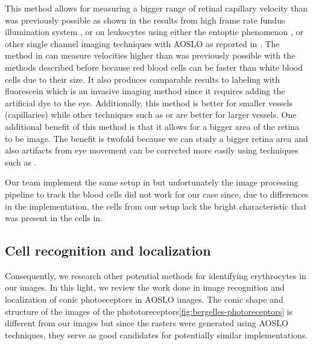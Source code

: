 \documentclass[]{article}
\begin{document}
This method allows for measuring a bigger range of retinal capillary velocity than was previously possible as shown in the results from high frame rate fundus illumination system \cite{bedggood_direct_2012}, or on leukocytes using either the entoptic phenomenon \cite{riva_blue_1980}\cite{grunwald_effect_1993}, or other single channel imaging techniques with AOSLO \cite{martin_pulsatility_2009}\cite{martin_direct_2005}\cite{tam_speed_2011}\cite{tam_characterization_2011} as reported in \cite{castro_rapid_2016}.
The method in\cite{castro_rapid_2016} can measure velocities higher than was previously possible with the methods described before because red blood cells can be faster than white blood cells due to their size. 
It also produces comparable results to labeling with fluorescein\cite{yang_fluorescent_1997}\cite{paques_evaluation_2000} which is an invasive imaging method since it requires adding the artificial dye to the eye.
Additionally, this method is better for smaller vessels (capillaries)  while other techniques such as \cite{zhong_vivo_2008} or \cite{riva_laser_1972} are better for larger vessels.
One additional benefit of this method is that it allows for a bigger area of the retina to be image.
The benefit is twofold because we can  study a bigger retina area and also artifacts from eye movement can be corrected more easily using techniques such as \cite{dubra_registration_2010}.

Our team implement the same setup in \cite{castro_rapid_2016} but unfortunately the image processing pipeline to track the blood cells did not work for our case since, due to differences in the implementation, the cells from our setup lack the bright characteristic that was present in the cells in\cite{castro_rapid_2016}. 

\subsection*{Cell recognition and localization}
Consequently, we research other potential methods for identifying erythrocytes in our images.
In this light, we review the work done in image recognition and localization of conic photoeceptors in AOSLO images.
The conic shape and structure of the images of the phototoreceptors\ref{fig:bergelles-photoreceptors} is different from our images but since the rasters were generated using AOSLO techniques, they serve as good candidates for potentially similar implementations.
\end{document}
